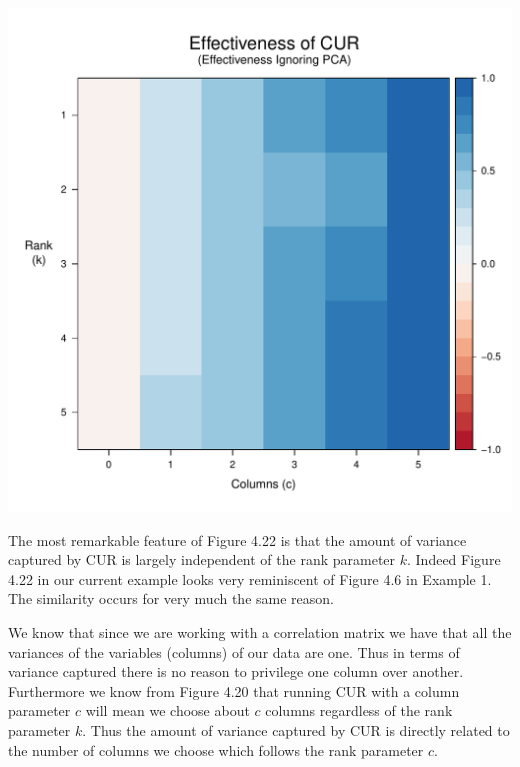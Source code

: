 \documentclass{book}
\begin{document}
\newpage
\begin{center}
\includegraphics[scale=.5]{./Figures/cs_ex_1/raster_cur.pdf}
\end{center}

The most remarkable feature of Figure 4.22 is that the amount of variance captured by CUR is largely independent of the rank parameter $k$. Indeed Figure 4.22 in our current example looks very reminiscent of Figure 4.6 in Example 1. The similarity occurs for very much the same reason. 

We know that since we are working with a correlation matrix we have that all the variances of the variables (columns) of our data are one. Thus in terms of variance captured there is no reason to privilege one column over another. Furthermore we know from Figure 4.20 that running CUR with a column parameter $c$ will mean we choose about $c$ columns regardless of the rank parameter $k$. Thus the amount of variance captured by CUR is directly related to the number of columns we choose which follows the rank parameter $c$. 
\end{document}
